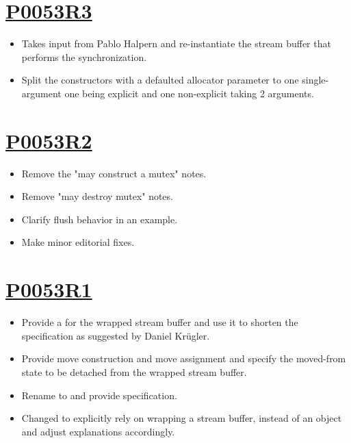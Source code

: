 \documentclass[ebook,11pt,article]{memoir}
\begin{document}
\section{\href{https://wg21.link/P0053R3}{P0053R3}}
\begin{itemize}
\item Takes input from Pablo Halpern and re-instantiate the stream buffer that performs the synchronization.
\item Split the constructors with a defaulted allocator parameter to one single-argument one being explicit and one non-explicit taking 2 arguments.
\end{itemize}

\section{\href{https://wg21.link/P0053R2}{P0053R2}}
\begin{itemize}
\item Remove the "may construct a mutex" notes.
\item Remove "may destroy mutex" notes.
\item Clarify  flush behavior in an example.
\item Make minor editorial fixes.
\end{itemize}

\section{\href{https://wg21.link/P0053R1}{P0053R1}}
\begin{itemize}
\item Provide a  for the wrapped stream buffer and use it to shorten the specification as suggested by Daniel Kr\"ugler.
\item Provide move construction and move assignment and specify the moved-from state to be detached from the wrapped stream buffer.
\item Rename  to  and provide  specification.
\item Changed to explicitly rely on wrapping a stream buffer, instead of an  object and adjust explanations accordingly.
\end{itemize}
\end{document}
